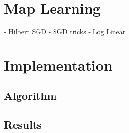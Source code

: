 \section{Map Learning}
\citet{ramos2016hilbert} - Hilbert SGD 
\citet{bottou2012stochastic} - SGD tricks
\citet{tsuruoka2009stochastic} - Log Linear

\section{Implementation}
\subsection{Algorithm}
\subsection{Results}


